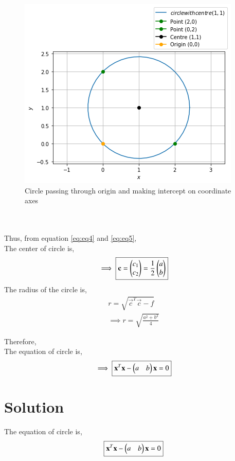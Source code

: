 \documentclass[journal,12pt,twocolumn]{IEEEtran}
\begin{document}
\begin{figure}[h!]
	\centering
	\includegraphics[width=\columnwidth]{circle.png}
	\caption{Circle passing through origin and making intercept on coordinate axes}
	\label{myfig}
\end{figure}\\
\\
Thus, from equation \eqref{eq:eq4} and \eqref{eq:eq5},\\ The center of circle is,
\begin{align}
    \implies \boxed{\mathbf{c} = \begin{pmatrix}c_1\\c_2\end{pmatrix} = \frac{1}{2}\begin{pmatrix}a\\ b\end{pmatrix}}
\end{align}
The radius of the circle is,
\begin{align}
    r=\sqrt{\vec{c}^{T}\vec{c}-f}\\
\implies \boxed{r=\sqrt{\frac{a^2+b^2}{4}}} \label{eq:eq6}
\end{align}

Therefore,\\ The equation of circle is,
\begin{align}
    \implies \boxed{\mathbf{x}^{T}\mathbf{x} - \begin{pmatrix}a&b\end{pmatrix}\mathbf{x}=0} \label{eq:eq7}
\end{align}
\section{Solution}
The equation of circle is,
\begin{align}
    \boxed{\mathbf{x}^{T}\mathbf{x} - \begin{pmatrix}a&b\end{pmatrix}\mathbf{x}=0} \label{eq:eq1}
\end{align}
\\
\end{document}
